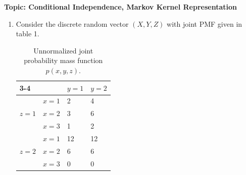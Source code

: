 

\flushleft\textbf{Topic: Conditional Independence, Markov Kernel Representation}
\begin{enumerate}
  \item %
  Consider the discrete random vector $(X, Y, Z)$ with joint PMF given in table 1.

  \begin{table}[htb]
    \centering
    \begin{tabular}{llll}
      \cline{3-4}
                                                   & \multicolumn{1}{l|}{}      & \multicolumn{1}{l|}{$y=1$} & \multicolumn{1}{l|}{$y=2$} \\ \hline
      \multicolumn{1}{|c|}{\multirow{3}{*}{$z=1$}} & \multicolumn{1}{l|}{$x=1$} & \multicolumn{1}{l|}{2}     & \multicolumn{1}{l|}{4}     \\ \cline{2-4}
      \multicolumn{1}{|c|}{}                       & \multicolumn{1}{l|}{$x=2$} & \multicolumn{1}{l|}{3}     & \multicolumn{1}{l|}{6}     \\ \cline{2-4}
      \multicolumn{1}{|c|}{}                       & \multicolumn{1}{l|}{$x=3$} & \multicolumn{1}{l|}{1}     & \multicolumn{1}{l|}{2}     \\ \hline
      \multicolumn{1}{|l|}{\multirow{3}{*}{$z=2$}} & \multicolumn{1}{l|}{$x=1$} & \multicolumn{1}{l|}{12}    & \multicolumn{1}{l|}{12}    \\ \cline{2-4}
      \multicolumn{1}{|l|}{}                       & \multicolumn{1}{l|}{$x=2$} & \multicolumn{1}{l|}{6}     & \multicolumn{1}{l|}{6}     \\ \cline{2-4}
      \multicolumn{1}{|l|}{}                       & \multicolumn{1}{l|}{$x=3$} & \multicolumn{1}{l|}{0}     & \multicolumn{1}{l|}{0}     \\ \hline
    \end{tabular}
    \caption{Unnormalized joint probability mass function $p(x, y, z)$.}
  \end{table}\label{discrete-ci}


\end{enumerate}
